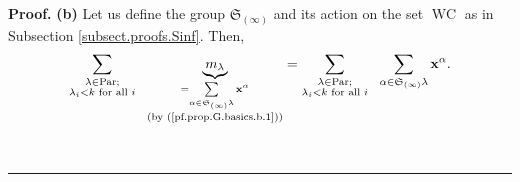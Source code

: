 \documentclass[numbers=enddot,12pt,final,onecolumn,notitlepage]{scrartcl}%
\theoremstyle{definition}
\newenvironment{proof}[1][Proof]{\noindent\textbf{#1.} }{\ \rule{0.5em}{0.5em}}
\let\sumnonlimits\sum
\renewcommand{\sum}{\sumnonlimits\limits}
\newenvironment{verlong}{}{}
\begin{document}
\begin{verlong}
\begin{proof}
\textbf{(b)} Let us define the group $\mathfrak{S}_{\left(  \infty\right)  }$
and its action on the set $\operatorname*{WC}$ as in Subsection
\ref{subsect.proofs.Sinf}. Then,%
\begin{equation}
\sum_{\substack{\lambda\in\operatorname*{Par};\\\lambda_{i}<k\text{ for all
}i}}\ \ \underbrace{m_{\lambda}}_{\substack{=\sum_{\alpha\in\mathfrak{S}%
_{\left(  \infty\right)  }\lambda}\mathbf{x}^{\alpha}\\\text{(by
(\ref{pf.prop.G.basics.b.1}))}}}=\sum_{\substack{\lambda\in\operatorname*{Par}%
;\\\lambda_{i}<k\text{ for all }i}}\ \ \sum_{\alpha\in\mathfrak{S}_{\left(
\infty\right)  }\lambda}\mathbf{x}^{\alpha}. \label{pf.prop.G.basics.b.new1}%
\end{equation}



\end{proof}
\end{verlong}
\end{document}
